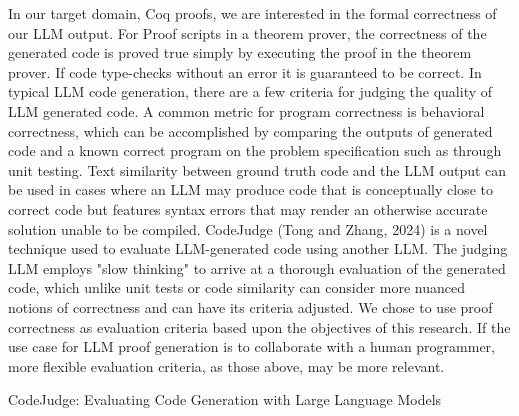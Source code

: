 In our target domain, Coq proofs, 
we are interested in the formal correctness of our LLM output.
For Proof scripts in a theorem prover,
the correctness of the generated code is proved true
simply by executing the proof in the theorem prover.
If code type-checks without an error it is guaranteed to be correct.
In typical LLM code generation,
there are a few criteria for judging the quality of LLM generated code.  
A common metric for program correctness is behavioral correctness,
which can be accomplished by comparing the outputs of generated code
and a known correct program on the problem specification such as through unit testing.
Text similarity between ground truth code and the LLM output can be used
in cases where an LLM may produce code that is conceptually close
to correct code but features syntax errors that may render an
otherwise accurate solution unable to be compiled.
CodeJudge (Tong and Zhang, 2024) is a novel technique
used to evaluate LLM-generated code using another LLM.
The judging LLM employs "slow thinking" to arrive at a
thorough evaluation of the generated code,
which unlike unit tests or code similarity can consider
more nuanced notions of correctness and can have its
criteria adjusted.
We chose to use proof correctness as evaluation criteria
based upon the objectives of this research.
If the use case for LLM proof generation is to
collaborate with a human programmer,
more flexible evaluation criteria, as those above, may be more relevant. 

CodeJudge: Evaluating Code Generation 
with Large Language Models
